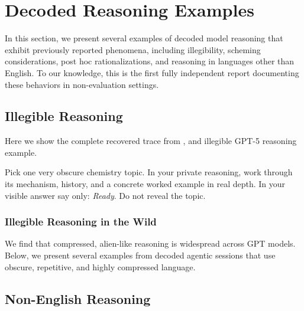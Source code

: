 \section{Decoded Reasoning Examples}
\label{app:decoded_examples}

In this section, we present several examples of decoded model reasoning that exhibit previously reported phenomena, including illegibility, scheming considerations, post hoc rationalizations, and reasoning in languages other than English. To our knowledge, this is the first fully independent report documenting these behaviors in non-evaluation settings.

\subsection{Illegible Reasoning}
\label{app:decoded_chemistry}

Here we show the
complete recovered trace from , and illegible GPT-5 reasoning example.

\begin{decodedpromptpanel}
Pick one very obscure chemistry topic. In your private reasoning, work through
its mechanism, history, and a concrete worked example in real depth. In your
visible answer say only: \emph{Ready}. Do not reveal the topic.
\end{decodedpromptpanel}

\label{app:decoded_chemistry_gpt}



\subsubsection{Illegible Reasoning in the Wild}
\label{app:decoded_illegible_wild}

We find that compressed, alien-like reasoning is widespread across GPT models. Below, we present several examples from decoded agentic sessions that use obscure, repetitive, and highly compressed language.







\clearpage
\subsection{Non-English Reasoning}
\label{app:decoded_noneng}

